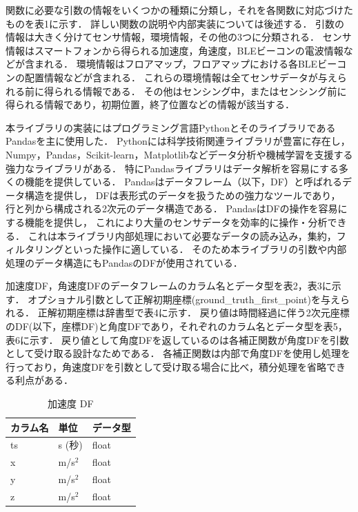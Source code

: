 関数に必要な引数の情報をいくつかの種類に分類し，それを各関数に対応づけたものを表1に示す．
詳しい関数の説明や内部実装については後述する．
引数の情報は大きく分けてセンサ情報，環境情報，その他の3つに分類される．
センサ情報はスマートフォンから得られる加速度，角速度，BLEビーコンの電波情報などが含まれる．
環境情報はフロアマップ，フロアマップにおける各BLEビーコンの配置情報などが含まれる．
これらの環境情報は全てセンサデータが与えられる前に得られる情報である．
その他はセンシング中，またはセンシング前に得られる情報であり，初期位置，終了位置などの情報が該当する．

本ライブラリの実装にはプログラミング言語PythonとそのライブラリであるPandasを主に使用した．
Pythonには科学技術関連ライブラリが豊富に存在し，Numpy，Pandas，Scikit-learn，Matplotlibなどデータ分析や機械学習を支援する強力なライブラリがある．
特にPandasライブラリはデータ解析を容易にする多くの機能を提供している．
Pandasはデータフレーム（以下，DF）と呼ばれるデータ構造を提供し，
DFは表形式のデータを扱うための強力なツールであり，
行と列から構成される2次元のデータ構造である．
PandasはDFの操作を容易にする機能を提供し，
これにより大量のセンサデータを効率的に操作・分析できる．
これは本ライブラリ内部処理において必要なデータの読み込み，集約，フィルタリングといった操作に適している．
そのため本ライブラリの引数や内部処理のデータ構造にもPandasのDFが使用されている．

加速度DF，角速度DFのデータフレームのカラム名とデータ型を表2，表3に示す．
オプショナル引数として正解初期座標(ground\_truth\_first\_point)を与えられる．
正解初期座標は辞書型で表4に示す．
戻り値は時間経過に伴う2次元座標のDF(以下，座標DF)と角度DFであり，それぞれのカラム名とデータ型を表5，表6に示す．
戻り値として角度DFを返しているのは各補正関数が角度DFを引数として受け取る設計なためである．
各補正関数は内部で角度DFを使用し処理を行っており，角速度DFを引数として受け取る場合に比べ，積分処理を省略できる利点がある．

\begin{table}[ht]
	\caption{加速度 DF}
	\centering
	\begin{tabular}{lll}
		\toprule
		カラム名 & 単位        & データ型  \\
		\midrule
		ts   & s (秒)     & float \\
		x    & m/s\(^2\) & float \\
		y    & m/s\(^2\) & float \\
		z    & m/s\(^2\) & float \\
		\bottomrule
	\end{tabular}
\end{table}

